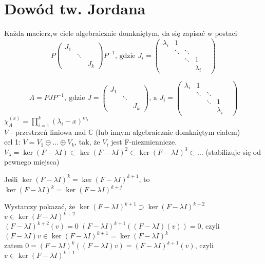 \section{Dowód tw. Jordana} 
\begin{tw}[Jordana]
    Każda macierz,w ciele algebraicznie domkniętym, da się zapisać w postaci 
    \[ P\begin{pmatrix} J_1 & & \\ & \ddots & \\ & & J_k \end{pmatrix}P^{-1}
    \text{, gdzie } J_i = \begin{pmatrix} \lambda_i & 1 & & & \\ & \ddots & \ddots & & \\ 
    & & \ddots & 1 \\ & & &  \lambda_i \end{pmatrix}
    \]
\end{tw} 
\[ A = PJP^{-1}, \ \text{gdzie } J = \begin{pmatrix} J_1 & & \\ & \ddots & \\ & & J_k \end{pmatrix}
\text{, a } J_i = \begin{pmatrix} \lambda_i & 1 & & & \\ & \ddots & \ddots & & \\ 
    & & \ddots & 1 \\ & & &  \lambda_i \end{pmatrix}
\]
$\chi_A^{(x)} = \prod\limits_{i=1}^k (\lambda_i - x)^{m_i}$ \\ 
$V$ - przestrzeń liniowa nad $\mathbb C$ (lub innym algebraicznie domkniętym ciałem) \\
cel 1: 
$V = V_1 \oplus \ldots \oplus V_k$, tak, że $V_i$ jest F-niezmiennicze. \\ 
$V_\lambda = \ker(F-\lambda I) \subset \ker (F - \lambda I)^2 \subset \ker(F - \lambda I)^3 \subset \ldots$ 
(stabilizuje się od pewnego miejsca) 
\begin{ft} 
        Jeśli $\ker(F - \lambda I)^k = \ker (F - \lambda I)^{k+1}$, to $\ker(F - \lambda I)^k = \ker(F - \lambda I)^{k+j}$
\end{ft} 
\begin{dd} 
    Wystarczy pokazać, że $\ker (F - \lambda I)^{k+1} \supset \ker(F - \lambda I)^{k+2}$ \\ 
    $v \in \ker (F - \lambda I)^{k+2}$ \\ 
    $(F - \lambda I)^{k+2} (v) = 0$ 
    $(F - \lambda I)^{k+1} ((F - \lambda I) (v)) = 0$, czyli $(F - \lambda I)v \in 
    \ker(F-\lambda I)^{k+1} = \ker(F - \lambda I)^k$ \\ 
    zatem $0 = (F - \lambda I)^k ((F - \lambda I)v) = (F - \lambda I)^{k+1} (v)$, czyli 
    $v \in \ker(F - \lambda I)^{k+1}$
\end{dd} 
